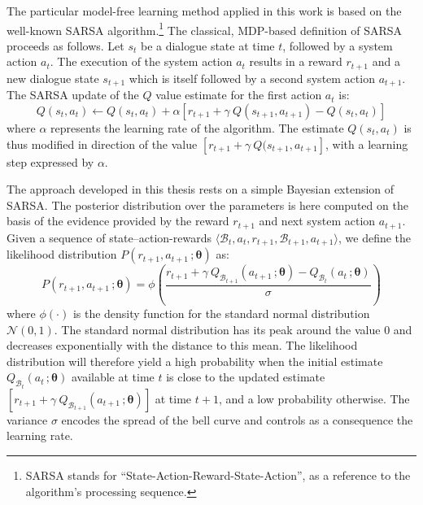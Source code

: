 The particular model-free learning method applied in this work is based on the well-known SARSA algorithm.\footnote{SARSA stands for ``State-Action-Reward-State-Action'', as a reference to the algorithm's processing sequence.} The classical, MDP-based definition of SARSA proceeds as follows. Let $s_t$ be a dialogue state at time $t$, followed by a system action $a_t$. The execution of the system action $a_t$ results in a reward $r_{t+1}$ and a new dialogue state $s_{t+1}$ which is itself followed by a second system action $a_{t+1}$.  The SARSA update of the $Q$ value estimate for the first action $a_t$ is:
\begin{equation}
Q(s_t, a_t) \leftarrow Q(s_t,a_t) + \alpha \left[r_{t+1} + \gamma \ Q(s_{t+1}, a_{t+1}) - Q(s_t, a_t) \right] 
\end{equation}
where $\alpha$ represents the learning rate of the algorithm. The estimate $Q(s_t, a_t)$ is thus modified in direction of the value $ \left[r_{t+1} + \gamma \ Q(s_{t+1}, a_{t+1} \right]$, with a learning step expressed by $\alpha$. 


The approach developed in this thesis rests on a simple Bayesian extension of SARSA.  The posterior distribution over the parameters is here computed on the basis of the evidence provided by the reward $r_{t+1}$ and next system action $a_{t+1}$.  Given a sequence of state--action-rewards $\langle \mathcal{B}_t, a_t, r_{t+1}, \mathcal{B}_{t+1}, a_{t+1} \rangle$, we define the likelihood distribution $P(r_{t+1}, a_{t+1} \,; \boldsymbol\theta)$ as:
\begin{equation}
P(r_{t+1}, a_{t+1} \,; \boldsymbol\theta) = \phi \left(\frac{r_{t+1} + \gamma \ Q_{\mathcal{B}_{t+1}} \left(a_{t+1} \,; \boldsymbol\theta\right) - Q_{\mathcal{B}_t}\left(a_t \,; \boldsymbol\theta\right)}{\sigma} \right) \label{eq:modelfreelikelihood}
\end{equation}
where $\phi(\cdot)$ is the density function for the standard normal distribution $\mathcal{N}(0, 1)$. The standard normal distribution has its peak around the value 0 and decreases exponentially with the distance to this mean. The likelihood distribution will therefore yield a high probability when the initial estimate 
$Q_{\mathcal{B}_t}(a_t \,; \boldsymbol\theta)$ available at time $t$ is close to the updated estimate $\left[r_{t+1} + \gamma \ Q_{\mathcal{B}_{t+1}} (a_{t+1} \,; \boldsymbol\theta) \right]$ at time $t+1$, and a low probability otherwise. The variance $\sigma$ encodes the spread of the bell curve and controls as a consequence the learning rate.

